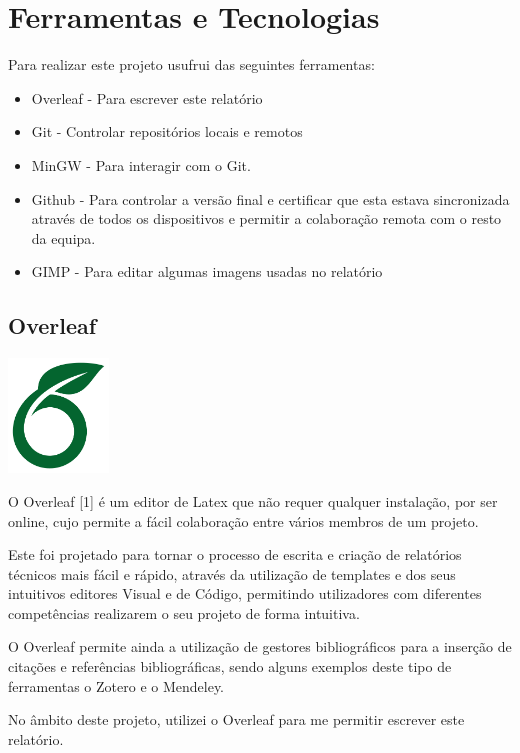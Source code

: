 \documentclass[a4paper,12pt]{article}
\begin{document}
\newpage

\section{Ferramentas e Tecnologias}
Para realizar este projeto usufrui das seguintes ferramentas:
\begin{itemize}
    \item Overleaf - Para escrever este relatório
    \item Git - Controlar repositórios locais e remotos
    \item MinGW - Para interagir com o Git.
    \item Github - Para  controlar a versão final e certificar que esta estava sincronizada através de todos os dispositivos e permitir a colaboração remota com o resto da equipa.
    \item GIMP - Para editar algumas imagens usadas no relatório
\end{itemize}

\subsection{Overleaf}
    \includegraphics[width=0.2\textwidth]{overleaf.jpg} %
    \vspace{0.5cm}

O Overleaf [1] é um editor de Latex que não requer qualquer instalação, por ser online, cujo permite a fácil colaboração entre vários membros de um projeto.

Este foi projetado para tornar o processo de escrita e criação de relatórios técnicos mais fácil e rápido, através da utilização de templates e dos seus intuitivos editores Visual e de Código, permitindo utilizadores com diferentes competências realizarem o seu projeto de forma intuitiva.

O Overleaf permite ainda a utilização de gestores bibliográficos para a inserção de citações e referências bibliográficas, sendo alguns exemplos deste tipo de ferramentas o Zotero e o Mendeley.

No âmbito deste projeto, utilizei o Overleaf para me permitir escrever este relatório.
\end{document}
